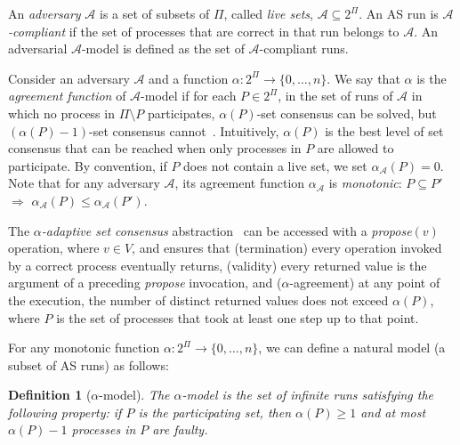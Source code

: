 \documentclass[a4paper]{article}
\newtheorem{definition}{Definition}
\def\A{\ensuremath{\mathcal{A}}}
\begin{document}
An \emph{adversary} $\A$ is a set of subsets of $\Pi$, called \emph{live sets}, $\A\subseteq 2^{\Pi}$.
%
%
An AS run is \emph{$\A$-compliant} if the set of processes that are correct in that run
belongs to $\A$. An adversarial $\A$-model is defined as the set of
$\A$-compliant runs. 

Consider  an adversary $\A$ and a function $\alpha: 2^{\Pi} \to \{0,\ldots,n\}$. 
We say that $\alpha$ is the \emph{agreement function} of $\A$-model if
for each $P\in 2^{\Pi}$, in the set of runs of $\A$ in which no process
in $\Pi\setminus P$ participates,
$\alpha(P)$-set consensus can be solved,  but $(\alpha(P)-1)$-set consensus cannot~\cite{KR17}.
Intuitively, $\alpha(P)$ is the best level of set consensus that
can be reached when only processes in $P$ are allowed to participate.
By convention, if $P$ does not contain a live set, we set
$\alpha_\A(P)=0$.
Note that for any adversary $\A$, its  agreement function $\alpha_{\A}$ is \emph{monotonic}:
$P\subseteq P'$ $\Rightarrow$ $\alpha_{\A}(P)\leq \alpha_{\A}(P')$. 

The \emph{$\alpha$-adaptive set consensus} abstraction~\cite{KR17}
can be accessed with a \textit{propose}$(v)$ operation, where $v \in V$, and ensures
that (termination) every operation invoked by a correct process
eventually returns, (validity) every returned value is the argument of a
preceding \textit{propose} invocation, and ($\alpha$-agreement) at any
point of the execution, the number of distinct returned values does not exceed
$\alpha(P)$, where $P$ is the set of processes that took at least one step
up to that point.     

For any monotonic function $\alpha: 2^{\Pi} \to \{0,\ldots,n\}$, we
can define a natural model (a subset of AS runs) as follows:
\begin{definition}[$\alpha$-model] 
  The \emph{$\alpha$-model} is the set of infinite
 runs satisfying the following property: if $P$ is the 
 participating set, then $\alpha(P)\geq 1$ and  at most $\alpha(P)-1$
 processes in $P$ are faulty.
\end{definition}
\end{document}
